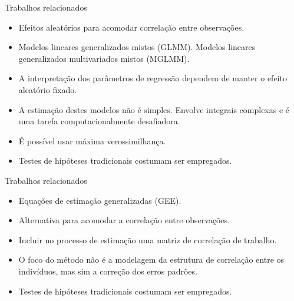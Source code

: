 \documentclass[
  ignorenonframetext,
  serif,
  professionalfont,
  usenames,
  dvipsnames,
  aspectratio = 169]{beamer}
\begin{document}
\begin{frame}{Trabalhos relacionados}
\protect\hypertarget{trabalhos-relacionados-2}{}
\begin{itemize}
  \itemsep 2ex
  
  \item Efeitos aleatórios para acomodar correlação entre observações.

  \item Modelos lineares generalizados mistos (GLMM). Modelos lineares generalizados multivariados mistos (MGLMM).
  
 \item A interpretação dos parâmetros de regressão dependem de manter o efeito aleatório fixado.
 
 \item A estimação destes modelos não é simples. Envolve integrais complexas e é uma tarefa computacionalmente desafiadora.

 \item É possível usar máxima verossimilhança. 
 
 \item Testes de hipóteses tradicionais costumam ser empregados.
  
\end{itemize}
\end{frame}

\begin{frame}{Trabalhos relacionados}
\protect\hypertarget{trabalhos-relacionados-3}{}
\begin{itemize}
  \itemsep 2ex
  
  \item Equações de estimação generalizadas (GEE).

  \item Alternativa para acomodar a correlação entre observações. 
 
  \item Incluir no processo de estimação uma matriz de correlação de trabalho. 
 
  \item O foco do método não é a modelagem da estrutura de correlação entre os indivíduos, mas sim a correção dos erros padrões.
 
  \item Testes de hipóteses tradicionais costumam ser empregados.
  
\end{itemize}
\end{frame}
\end{document}
